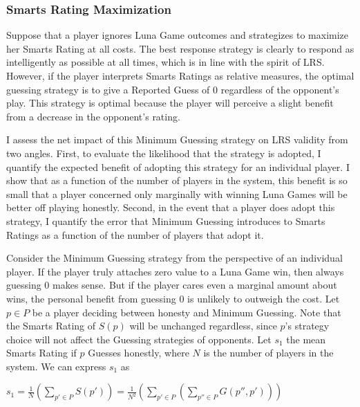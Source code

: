 \subsubsection{Smarts Rating Maximization}

Suppose that a player ignores Luna Game outcomes and strategizes to maximize her Smarts Rating at all costs. The best response strategy is clearly to respond as intelligently as possible at all times, which is in line with the spirit of LRS. However, if the player interprets Smarts Ratings as relative measures, the optimal guessing strategy is to give a Reported Guess of $0$ regardless of the opponent's play. This strategy is optimal because the player will perceive a slight benefit from a decrease in the opponent's rating. 

I assess the net impact of this Minimum Guessing strategy on LRS validity from two angles. First, to evaluate the likelihood that the strategy is adopted, I quantify the expected benefit of adopting this strategy for an individual player. I show that as a function of the number of players in the system, this benefit is so small that a player concerned only marginally with winning Luna Games will be better off playing honestly. Second, in the event that a player does adopt this strategy, I quantify the error that Minimum Guessing introduces to Smarts Ratings as a function of the number of players that adopt it.

Consider the Minimum Guessing strategy from the perspective of an individual player. If the player truly attaches zero value to a Luna Game win, then always guessing 0 makes sense. But if the player cares even a marginal amount about wins, the personal benefit from guessing 0 is unlikely to outweigh the cost. Let $p \in P$ be a player deciding between honesty and Minimum Guessing. Note that the Smarts Rating of $S(p)$ will be unchanged regardless, since $p$'s strategy choice will not affect the Guessing strategies of opponents. Let $s_1$ the mean Smarts Rating if $p$ Guesses honestly, where $N$ is the number of players in the system. We can express $s_1$ as
\begin{center}
\begin{math}
s_1 = \frac{1}{N}(\sum_{p' \in P}S(p')) = \frac{1}{N^2}(\sum_{p' \in P}(\sum_{p'' \in P}G(p'', p')))
\end{math}
\end{center}


